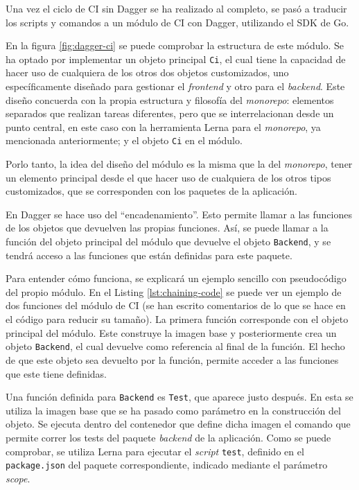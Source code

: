 Una vez el ciclo de CI sin Dagger se ha realizado al completo, se pasó a traducir los scripts y comandos a un módulo de CI con Dagger, utilizando el SDK de Go.

En la figura \ref{fig:dagger-ci} se puede comprobar la estructura de este módulo. Se ha optado por implementar un objeto principal \texttt{Ci}, el cual tiene la capacidad de hacer uso de cualquiera de los otros dos objetos customizados, uno específicamente diseñado para gestionar el \textit{frontend} y otro para el \textit{backend}. Este diseño concuerda con la propia estructura y filosofía del \textit{monorepo}: elementos separados que realizan tareas diferentes, pero que se interrelacionan desde un punto central, en este caso con la herramienta Lerna para el \textit{monorepo}, ya mencionada anteriormente; y el objeto \texttt{Ci} en el módulo.

Porlo tanto, la idea del diseño del módulo es la misma que la del \textit{monorepo}, tener un elemento principal desde el que hacer uso de cualquiera de los otros tipos customizados\cite{dagger-custom-types}, que se corresponden con los paquetes de la aplicación.

En Dagger se hace uso del ``encadenamiento''. Esto permite llamar a las funciones de los objetos que devuelven las propias funciones. Así, se puede llamar a la función del objeto principal del módulo que devuelve el objeto \texttt{Backend}, y se tendrá acceso a las funciones que están definidas para este paquete.

Para entender cómo funciona, se explicará un ejemplo sencillo con pseudocódigo del propio módulo. En el Listing \ref{lst:chaining-code} se puede ver un ejemplo de dos funciones del módulo de CI (se han escrito comentarios de lo que se hace en el código para reducir su tamaño). La primera función corresponde con el objeto principal del módulo. Este construye la imagen base y posteriormente crea un objeto \texttt{Backend}, el cual devuelve como referencia al final de la función. El hecho de que este objeto sea devuelto por la función, permite acceder a las funciones que este tiene definidas.

Una función definida para \texttt{Backend} es \texttt{Test}, que aparece justo después. En esta se utiliza la imagen base que se ha pasado como parámetro en la construcción del objeto. Se ejecuta dentro del contenedor que define dicha imagen el comando que permite correr los tests del paquete \textit{backend} de la aplicación. Como se puede comprobar, se utiliza Lerna para ejecutar el \textit{script} \texttt{test}, definido en el \texttt{package.json} del paquete correspondiente, indicado mediante el parámetro \textit{scope}.

